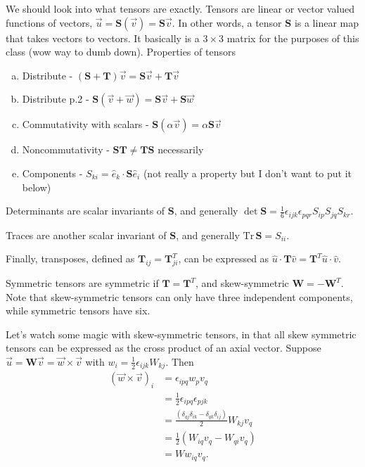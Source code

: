 \documentclass[10pt]{report}
\begin{document}
We should look into what tensors are exactly. Tensors are linear or vector valued functions of vectors, $\vec{u} = \mathbf{S}(\vec{v}) = \mathbf{S}\vec{v}$. In other words, a tensor $\mathbf{S}$ is a linear map that takes vectors to vectors. It basically is a $3\times3$ matrix for the purposes of this class (wow way to dumb down). Properties of tensors
\begin{enumerate}[a)]
    \item Distribute - $(\mathbf{S} + \mathbf{T})\vec{v} = \mathbf{S}\vec{v} + \mathbf{T}\vec{v}$
    \item Distribute p.2 - $\mathbf{S}(\vec{v} + \vec{w}) = \mathbf{S}\vec{v} + \mathbf{S}\vec{w}$
    \item Commutativity with scalars - $\mathbf{S}(\alpha \vec{v}) = \alpha \mathbf{S}\vec{v}$
    \item Noncommutativity - $\mathbf{S}\mathbf{T} \neq \mathbf{T}\mathbf{S}$ necessarily
    \item Components - $S_{ki} = \hat{e}_k \cdot \mathbf{S}\hat{e}_i$ (not really a property but I don't want to put it below)
\end{enumerate}

Determinants are scalar invariants of $\mathbf{S}$, and generally $\det \mathbf{S} = \frac{1}{6}\epsilon_{ijk}\epsilon_{pqr}S_{ip}S_{jq}S_{kr}$.

Traces are another scalar invariant of $\mathbf{S}$, and generally $\mathrm{Tr}\, \mathbf{S} = S_{ii}$.

Finally, transposes, defined as $\mathbf{T}_{ij} = \mathbf{T}^T_{ji}$, can be expressed as $\hat{u}\cdot\mathbf{T}\hat{v} = \mathbf{T}^T\hat{u}\cdot\hat{v}$.

Symmetric tensors are symmetric if $\mathbf{T} = \mathbf{T}^T$, and skew-symmetric $\mathbf{W} = -\mathbf{W}^T$. Note that skew-symmetric tensors can only have three independent components, while symmetric tensors have six. 

Let's watch some magic with skew-symmetric tensors, in that all skew symmetric tensors can be expressed as the cross product of an axial vector. Suppose $\vec{u} = \mathbf{W}\vec{v} = \vec{w}\times\vec{v}$ with $w_i = \frac{1}{2}\epsilon_{ijk}W_{kj}$. Then 
\begin{align}
    (\vec{w}\times\vec{v})_i &= \epsilon_{ipq}w_pv_q\\
    &= \frac{1}{2}\epsilon_{ipq}\epsilon_{pjk}\\
    &= \frac{\left( \delta_{qj}\delta_{ik} - \delta_{qk}\delta_{ij} \right)}{2}W_{kj}v_q\\
    &= \frac{1}{2}\left( W_{iq}v_q - W_{qi}v_q \right)\\
    &= Ww_{iq}v_q.
\end{align}
\end{document}
